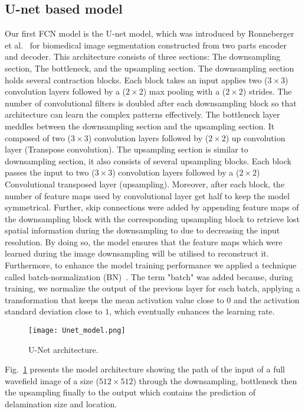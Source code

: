 \documentclass[preprint,9pt]{elsarticle}
\begin{document}
\subsection{U-net based model}
Our first FCN model is the U-net model, which was introduced by Ronneberger et al.~\cite{Ronneberger2015} for biomedical image segmentation constructed from two parts encoder and decoder. 
This architecture consists of three sections: The downsampling section, The bottleneck, and the upsampling section. 
The downsampling section holds several contraction blocks. 
Each block takes an input applies two (\(3\times3\)) convolution layers followed by a (\(2\times2\)) max pooling with a (\(2\times2\)) strides. 
The number of convolutional filters is doubled after each downsampling block so that architecture can learn the complex patterns effectively. 
The bottleneck layer meddles between the downsampling section and the upsampling section. 
It composed of two (\(3\times3\)) convolution layers followed by (\(2\times2\)) up convolution layer (Transpose convolution).
The upsampling section is similar to downsampling section, it also consists of several upsampling blocks. 
Each block passes the input to two (\(3\times3\)) convolution layers followed by a (\(2\times2\)) Convolutional transposed layer (upsampling). 
Moreover, after each block, the number of feature maps used by convolutional layer get half to keep the model symmetrical. 
Further, skip connections were added by appending feature maps of the downsampling block with the corresponding upsampling block to retrieve lost spatial information during the downsampling to due to decreasing the input resolution.
By doing so, the model ensures that the feature maps which were learned during the image downsampling will be utilised to reconstruct it. 
Furthermore, to enhance the model training performance we applied a technique called batch-normalization (BN)~\cite{Ioffe2015}.
The term "batch" was added because, during training, we normalize the output of the previous layer for each batch, applying a transformation that keeps the mean activation value close to \(0\) and the activation standard deviation close to \(1\), which eventually enhances the learning rate.
\begin{figure} [h!]
	\begin{center}
		\texttt{[image: Unet\_model.png]}
	\end{center}
	\caption{U-Net architecture.} 
	\label{fig:Unet}
\end{figure}
Fig.~\ref{fig:Unet} presents the model architecture showing the path of the input of a full wavefield image of a size (\(512\times512\)) through the downsampling, bottleneck then the upsampling finally to the output which contains the prediction of delamination size and location. 
\end{document}
